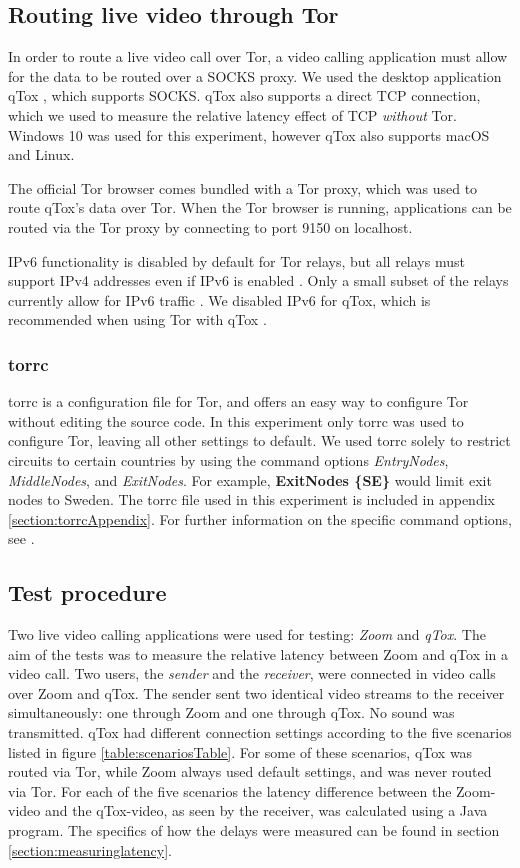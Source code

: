 \documentclass{kththesis}
\begin{document}
\subsection{Routing live video through Tor}
In order to route a live video call over Tor, a video calling application must allow for the data to be routed over a SOCKS proxy. We used the desktop application qTox \parencite{qTox}, which supports SOCKS. qTox also supports a direct TCP connection, which we used to measure the relative latency effect of TCP \emph{without} Tor. Windows 10 was used for this experiment, however qTox also supports macOS and Linux.

The official Tor browser comes bundled with a Tor proxy, which was used to route qTox's data over Tor. When the Tor browser is running, applications can be routed via the Tor proxy by connecting to port 9150 on localhost.

IPv6 functionality is disabled by default for Tor relays, but all relays must support IPv4 addresses even if IPv6 is enabled \parencite{TorIPv6}. Only a small subset of the relays currently allow for IPv6 traffic \parencite{TorMetricsIPv6}. We disabled IPv6 for qTox, which is recommended when using Tor with qTox \parencite{qToxOverTor}.

\subsubsection{torrc}
torrc is a configuration file for Tor, and offers an easy way to configure Tor without editing the source code. In this experiment only torrc was used to configure Tor, leaving all other settings to default. We used torrc solely to restrict circuits to certain countries by using the command options \emph{EntryNodes}, \emph{MiddleNodes}, and \emph{ExitNodes}. For example, \textbf{ExitNodes \{SE\}} would limit exit nodes to Sweden. The torrc file used in this experiment is included in appendix \ref{section:torrcAppendix}. For further information on the specific command options, see \textcite{torrcmanpages}.

\subsection{Test procedure}
Two live video calling applications were used for testing: \emph{Zoom} and \emph{qTox}. The aim of the tests was to measure the relative latency between Zoom and qTox in a video call. Two users, the \emph{sender} and the \emph{receiver}, were connected in video calls over Zoom and qTox. The sender sent two identical video streams to the receiver simultaneously: one through Zoom and one through qTox. No sound was transmitted. qTox had different connection settings according to the five scenarios listed in figure \ref{table:scenariosTable}. For some of these scenarios, qTox was routed via Tor, while Zoom always used default settings, and was never routed via Tor. For each of the five scenarios the latency difference between the Zoom-video and the qTox-video, as seen by the receiver, was calculated using a Java program. The specifics of how the delays were measured can be found in section \ref{section:measuringlatency}.
\end{document}
